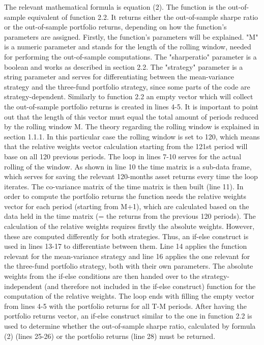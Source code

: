 \documentclass{article}
\begin{document}
The relevant mathematical formula is equation (2). The function is the out-of-sample equivalent of function 2.2. It returns either the out-of-sample sharpe ratio or the out-of-sample portfolio returns, depending on how the function's parameters are assigned. Firstly, the function's parameters will be explained. "M" is a numeric parameter and stands for the length of the rolling window, needed for performing the out-of-sample computations. The "sharperatio" parameter is a boolean and works as described in section 2.2. The "strategy" parameter is a string parameter and serves for differentiating between the mean-variance strategy and the three-fund portfolio strategy, since some parts of the code are strategy-dependent. Similarly to function 2.2 an empty vector which will collect the out-of-sample portfolio returns is created in lines 4-5. It is important to point out that the length of this vector must equal the total amount of periods reduced by the rolling window M. The theory regarding the rolling window is explained in section 1.1.1. In this particular case the rolling window is set to 120, which means that the relative weights vector calculation starting from the 121st period will base on all 120 previous periods. The loop in lines 7-10 serves for the actual rolling of the window. As shown in line 10 the time matrix is a sub-data frame, which serves for saving the relevant 120-months asset returns every time the loop iterates. The co-variance matrix of the time matrix is then built (line 11). In order to compute the portfolio returns the function needs the relative weights vector for each period (starting from M+1), which are calculated based on the data held in the time matrix (= the returns from the previous 120 periods). The calculation of the relative weights requires firstly the absolute weights. However, these are computed differently for both strategies. Thus, an if-else construct is used in lines 13-17 to differentiate between them. Line 14 applies the function relevant for the mean-variance strategy and line 16 applies the one relevant for the three-fund portfolio strategy, both with their own parameters. The absolute weights from the if-else conditions are then handed over to the strategy-independent (and therefore not included in the if-else construct) function for the computation of the relative weights. The loop ends with filling the empty vector from lines 4-5 with the portfolio returns for all T-M periods. After having the portfolio returns vector, an if-else construct similar to the one in function 2.2 is used to determine whether the out-of-sample sharpe ratio, calculated by formula (2) (lines 25-26) or the portfolio returns (line 28) must be returned.
\end{document}
